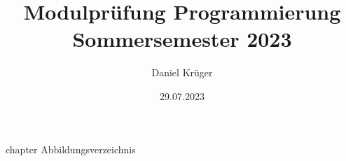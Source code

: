\documentclass{scrreprt}
\title{Modulprüfung Programmierung Sommersemester 2023}
\author{Daniel Krüger \\ \matrikelnummer}
\date{29.07.2023}
\begin{document}
\nocite{*}

\maketitle

\tableofcontents

\listoffigures
{} {chapter} {Abbildungsverzeichnis}















\end{document}
